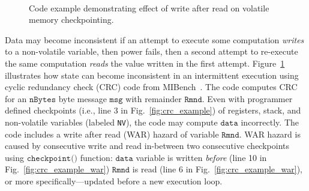 \begin{figure}
	\centering
	\\
	\caption{Code example demonstrating effect of write after read on volatile memory checkpointing.}
	\label{fig:code_demo_incosistency}
\end{figure}


Data may become inconsistent if an attempt to execute some computation {\em
writes} to a non-volatile variable, then power fails, then a second attempt to
re-execute the same computation {\em reads} the value written in the first
attempt.  Figure~\ref{fig:code_demo_incosistency} illustrates how state can
become inconsistent in an intermittent execution using cyclic redundancy check
(CRC) code from MIBench~\cite{hicks_mibench2_2016}. The code computes CRC for
an $\texttt{nBytes}$ byte message $\texttt{msg}$ with remainder
$\texttt{Rmnd}$. Even with programmer defined checkpoints (i.e., line 3 in
Fig.~\ref{fig:crc_example}) of registers, stack, and non-volatile variables
(labeled \texttt{NV}), the code may compute  $\texttt{data}$ incorrectly.  The
code includes a write after read (WAR) hazard of variable $\texttt{Rmnd}$.  WAR
hazard is caused by consecutive write and read in-between two consecutive
checkpoints using $\texttt{checkpoint()}$ function: $\texttt{data}$ variable is
written \emph{before} (line 10 in Fig.~\ref{fig:crc_example_war})
$\texttt{Rmnd}$ is read (line 6 in Fig.~\ref{fig:crc_example_war}), or more
specifically---updated before a new execution loop. 

